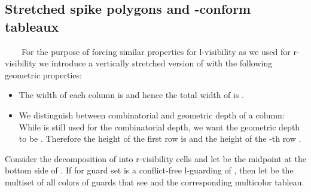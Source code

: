 \documentclass[a4paper,USenglish,numberwithinsect]{lipics}
\theoremstyle{plain}
\begin{document}
\subsection{Stretched spike polygons and {\bf }-conform tableaux}
\ \ \ \ For the purpose of forcing similar properties for l-visibility as we
used for r-visibility
we introduce a vertically stretched version  of   with the
following geometric properties:
\begin{itemize}
\item The width of each column is  and hence the total width of  
 is
.   
\item We  distinguish between combinatorial and geometric depth of a
column:
While   is still used for the combinatorial depth,  we
want  the  geometric depth to  be  .
Therefore the height of the first row is  and the height of
the -th row  .
\end{itemize}
Consider the decomposition of  into r-visibility cells
 and let
 be the midpoint at the bottom side of  .
If  for guard set   is a  conflict-free l-guarding of
, then
let  be the multiset of all colors of guards that see
 and 
the corresponding multicolor tableau.
\end{document}
